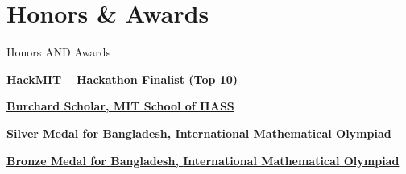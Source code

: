 \section{Honors \& Awards}
{Honors\newline
AND Awards}

\href{https://shass.mit.edu/news/news-2018-shass-selects-36-mit-students-2018-burchard-scholars}
{\textbf{HackMIT -- Hackathon Finalist (Top 10)}}
\hfill 
{}
\MiniEntryGap

\href{https://shass.mit.edu/news/news-2018-shass-selects-36-mit-students-2018-burchard-scholars}
{\textbf{Burchard Scholar, MIT School of HASS}}
\hfill 
{}
\MiniEntryGap

\href{http://www.imo-official.org/participant_r.aspx?id=20847}
{{{\textbf{Silver Medal for Bangladesh, {International Mathematical Olympiad} } } } }
\hfill
{}
\MiniEntryGap

\href{http://www.imo-official.org/participant_r.aspx?id=20847}
{{{\textbf{Bronze Medal for Bangladesh, {International Mathematical Olympiad} } } } }
\hfill
{}
\MiniEntryGap
